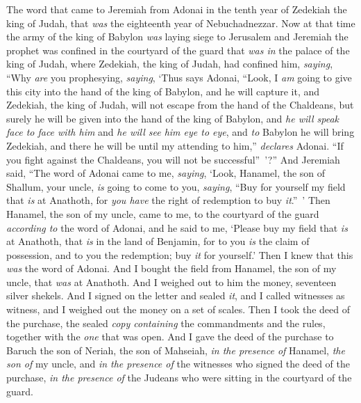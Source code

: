 \begin{biblechapter} %
 The word that came to Jeremiah from Adonai in the tenth year of Zedekiah the king of Judah, that \textit{was} the eighteenth year of Nebuchadnezzar.
\verse Now at that time the army of the king of Babylon \textit{was} laying siege to Jerusalem and Jeremiah the prophet was confined in the courtyard of the guard that \textit{was in} the palace of the king of Judah,
\verse where Zedekiah, the king of Judah, had confined him, \textit{saying}, “Why \textit{are} you prophesying, \textit{saying}, ‘Thus says Adonai, “Look, I \textit{am} going to give this city into the hand of the king of Babylon, and he will capture it,
\verse and Zedekiah, the king of Judah, will not escape from the hand of the Chaldeans, but surely he will be given into the hand of the king of Babylon, and \textit{he will speak face to face with him} and \textit{he will see him eye to eye},
\verse and \textit{to} Babylon he will bring Zedekiah, and there he will be until my attending to him,” \textit{declares} Adonai. “If you fight against the Chaldeans, you will not be successful” ’?”
\verse And Jeremiah said, “The word of Adonai came to me, \textit{saying},
\verse ‘Look, Hanamel, the son of Shallum, your uncle, \textit{is} going to come to you, \textit{saying}, “Buy for yourself my field that \textit{is} at Anathoth, for \textit{you have} the right of redemption to buy \textit{it}.” ’
\verse Then Hanamel, the son of my uncle, came to me, to the courtyard of the guard \textit{according to} the word of Adonai, and he said to me, ‘Please buy my field that \textit{is} at Anathoth, that \textit{is} in the land of Benjamin, for to you \textit{is} the claim of possession, and to you the redemption; buy \textit{it} for yourself.’ Then I knew that this \textit{was} the word of Adonai.
\verse And I bought the field from Hanamel, the son of my uncle, that \textit{was} at Anathoth. And I weighed out to him the money, seventeen silver shekels.
\verse And I signed on the letter and sealed \textit{it}, and I called witnesses as witness, and I weighed out the money on a set of scales.
\verse Then I took the deed of the purchase, the sealed \textit{copy containing} the commandments and the rules, together with the \textit{one} that was open.
\verse And I gave the deed of the purchase to Baruch the son of Neriah, the son of Mahseiah, \textit{in the presence of} Hanamel, \textit{the son of} my uncle, and \textit{in the presence of} the witnesses who signed the deed of the purchase, \textit{in the presence of} the Judeans who were sitting in the courtyard of the guard.

\end{biblechapter}

